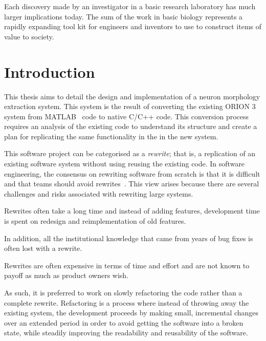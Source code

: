 \begin{savequote}[0.55\linewidth]
	\begin{fancyquote}
		Each discovery made by an investigator in a basic research
		laboratory has much larger implications today. The sum of the work in basic
		biology represents a rapidly expanding tool kit for engineers and inventors to
		use to construct items of value to society.
	\end{fancyquote}
\end{savequote}
\chapter{Introduction}\label{ch:introduction}

This thesis aims to detail the design and implementation of a
neuron morphology extraction system. This system is the result of
converting the existing ORION 3~\citep{ORION_Santamaria-Pang2015} system from
MATLAB~\citep{MATLAB:2013a} code to native C/C++ code.
This conversion process requires an analysis of the existing code
to understand its structure and create a plan for replicating the
same functionality in the in the new system.

This software project can be categorised as a \emph{rewrite}; that
is, a replication of an existing software system without using
reusing the existing code. In software engineering, the consensus
on rewriting software from scratch is that it is difficult and
that teams should avoid rewrites~\citep{JoelRewrite}. This view
arises because there are several challenges and risks associated
with rewriting large systems.
\begin{inparablank}
\item Rewrites often take a long time and instead of adding
	features, development time is spent on redesign and
	reimplementation of old features.
\item In addition, all the institutional knowledge that came from
	years of bug fixes is often lost with a rewrite.
\item Rewrites are often expensive in terms of time and effort and
	are not known to payoff as much as product owners wish.
\end{inparablank}
As such, it is preferred to work on slowly refactoring the code
rather than a complete rewrite.  Refactoring is a process where
instead of throwing away the existing system, the development
proceeds by making small, incremental changes over an extended
period in order to avoid getting the software into a broken state,
while steadily improving the readability and reusability of the
software.

